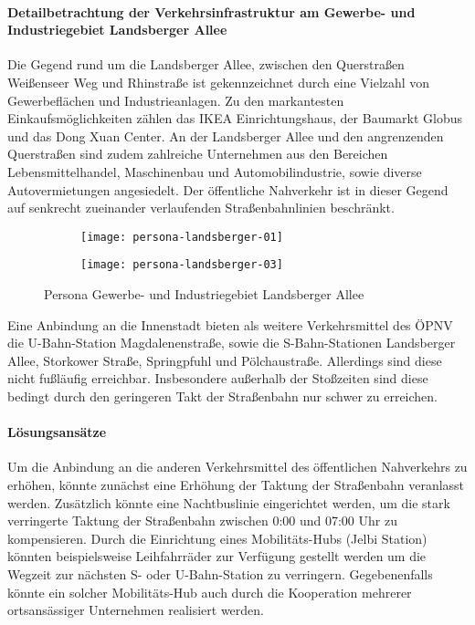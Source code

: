\paragraph{Detailbetrachtung der Verkehrsinfrastruktur am Gewerbe- und Industriegebiet Landsberger Allee}
Die Gegend rund um die Landsberger Allee, zwischen den Querstraßen Weißenseer Weg und Rhinstraße ist gekennzeichnet durch eine Vielzahl von Gewerbeflächen und Industrieanlagen. Zu den markantesten Einkaufsmöglichkeiten zählen das IKEA Einrichtungshaus, der Baumarkt Globus und das Dong Xuan Center. An der Landsberger Allee und den angrenzenden Querstraßen sind zudem zahlreiche Unternehmen aus den Bereichen Lebensmittelhandel, Maschinenbau und Automobilindustrie, sowie diverse Autovermietungen angesiedelt. Der öffentliche Nahverkehr ist in dieser Gegend auf senkrecht zueinander verlaufenden Straßenbahnlinien beschränkt.

\begin{figure}
    \centering
    \begin{subfigure}{.5\textwidth}
        \centering
        \texttt{[image: persona-landsberger-01]}
    \end{subfigure}%
    \begin{subfigure}{.5\textwidth}
        \centering
        \texttt{[image: persona-landsberger-03]}
    \end{subfigure}
    \caption{Persona Gewerbe- und Industriegebiet Landsberger Allee}
    \label{persona-landsberger-allee}
\end{figure}

Eine Anbindung an die Innenstadt bieten als weitere Verkehrsmittel des ÖPNV die U-Bahn-Station Magdalenenstraße, sowie die S-Bahn-Stationen Landsberger Allee, Storkower Straße, Springpfuhl und Pölchaustraße. Allerdings sind diese nicht fußläufig erreichbar. Insbesondere außerhalb der Stoßzeiten sind diese bedingt durch den geringeren Takt der Straßenbahn nur schwer zu erreichen.

\paragraph{Lösungsansätze}
Um die Anbindung an die anderen Verkehrsmittel des öffentlichen Nahverkehrs zu erhöhen, könnte zunächst eine Erhöhung der Taktung der Straßenbahn veranlasst werden. Zusätzlich könnte eine Nachtbuslinie eingerichtet werden, um die stark verringerte Taktung der Straßenbahn zwischen 0:00 und 07:00 Uhr zu kompensieren. Durch die Einrichtung eines Mobilitäts-Hubs (Jelbi Station) könnten beispielsweise Leihfahrräder zur Verfügung gestellt werden um die Wegzeit zur nächsten S- oder U-Bahn-Station zu verringern. Gegebenenfalls könnte ein solcher Mobilitäts-Hub auch durch die Kooperation mehrerer ortsansässiger Unternehmen realisiert werden.

